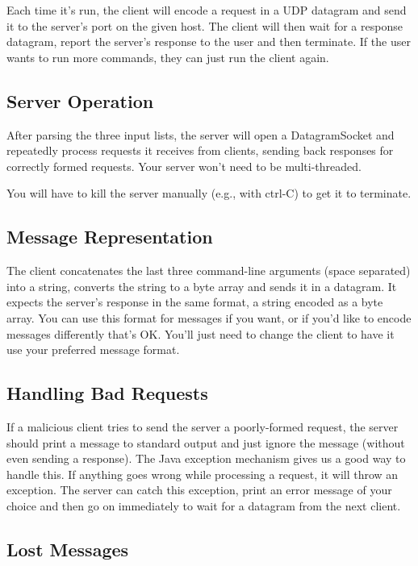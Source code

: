 \documentclass{article}
\begin{document}
\begin{enumerate}
  Each time it's run, the client will encode a request in a UDP
  datagram and send it to the server's port on the given host.  The
  client will then wait for a response datagram, report the server's
  response to the user and then terminate.  If the user wants to run
  more commands, they can just run the client again.

\subsection*{Server Operation}

  After parsing the three input lists, the server will open a
  DatagramSocket and repeatedly process requests it receives from
  clients, sending back responses for correctly formed requests.  Your
  server won't need to be multi-threaded.

  You will have to kill the server manually (e.g., with ctrl-C) to get
  it to terminate.

\subsection*{Message Representation}

  The client concatenates the last three command-line arguments (space
  separated) into a string, converts the string to a byte array and
  sends it in a datagram.  It expects the server's response in the
  same format, a string encoded as a byte array.  You can use this
  format for messages if you want, or if you'd like to encode messages
  differently that's OK.  You'll just need to change the client to
  have it use your preferred message format.

\subsection*{Handling Bad Requests}

  If a malicious client tries to send the server a poorly-formed
  request, the server should print a message to standard output and
  just ignore the message (without even sending a response).  The
  Java exception mechanism gives us a good way to handle this.  If anything
  goes wrong while processing a request, it will throw an
  exception.  The server can catch this exception, print an error
  message of your choice and then go on immediately to wait for a
  datagram from the next client.

\subsection*{Lost Messages}


\end{enumerate}
\end{document}
